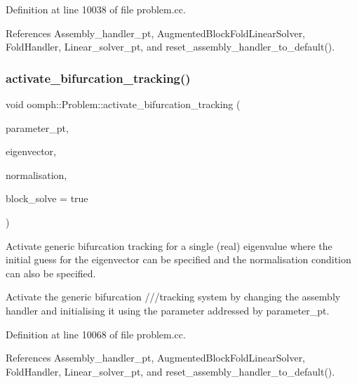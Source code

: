 Definition at line 10038 of file problem.\+cc.



References Assembly\+\_\+handler\+\_\+pt, Augmented\+Block\+Fold\+Linear\+Solver, Fold\+Handler, Linear\+\_\+solver\+\_\+pt, and reset\+\_\+assembly\+\_\+handler\+\_\+to\+\_\+default().

\mbox{\label{classoomph_1_1Problem_a4610ef4c4f4d7c1d7001fabf074c930c}} 
\subsubsection{\texorpdfstring{activate\+\_\+bifurcation\+\_\+tracking()}{activate\_bifurcation\_tracking()}\hspace{0.1cm}{\footnotesize\ttfamily [2/2]}}
{\footnotesize\ttfamily void oomph\+::\+Problem\+::activate\+\_\+bifurcation\+\_\+tracking (\begin{DoxyParamCaption}\item[{double $\ast$const \&}]{parameter\+\_\+pt,  }\item[{const \hyperlink{classoomph_1_1DoubleVector}{Double\+Vector} \&}]{eigenvector,  }\item[{const \hyperlink{classoomph_1_1DoubleVector}{Double\+Vector} \&}]{normalisation,  }\item[{const bool \&}]{block\+\_\+solve = {\ttfamily true} }\end{DoxyParamCaption})}



Activate generic bifurcation tracking for a single (real) eigenvalue where the initial guess for the eigenvector can be specified and the normalisation condition can also be specified. 

Activate the generic bifurcation ///tracking system by changing the assembly handler and initialising it using the parameter addressed by parameter\+\_\+pt. 

Definition at line 10068 of file problem.\+cc.



References Assembly\+\_\+handler\+\_\+pt, Augmented\+Block\+Fold\+Linear\+Solver, Fold\+Handler, Linear\+\_\+solver\+\_\+pt, and reset\+\_\+assembly\+\_\+handler\+\_\+to\+\_\+default().

